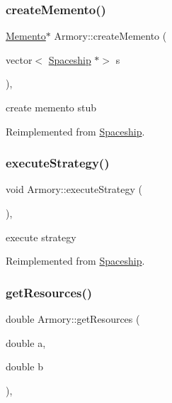 \subsubsection{\texorpdfstring{create\+Memento()}{createMemento()}}
{\footnotesize\ttfamily \hyperlink{classMemento}{Memento}$\ast$ Armory\+::create\+Memento (\begin{DoxyParamCaption}\item[{vector$<$ \hyperlink{classSpaceship}{Spaceship} $\ast$$>$}]{s }\end{DoxyParamCaption})\hspace{0.3cm}{\ttfamily [inline]}, {\ttfamily [virtual]}}

create memento stub 

Reimplemented from \hyperlink{classSpaceship_a6d272f846b019dec8226ddab65648a7b}{Spaceship}.

\mbox{\label{classArmory_aab75c86069fac4995a56c6318a33e504}} 
\subsubsection{\texorpdfstring{execute\+Strategy()}{executeStrategy()}}
{\footnotesize\ttfamily void Armory\+::execute\+Strategy (\begin{DoxyParamCaption}{ }\end{DoxyParamCaption})\hspace{0.3cm}{\ttfamily [inline]}, {\ttfamily [virtual]}}

execute strategy 

Reimplemented from \hyperlink{classSpaceship}{Spaceship}.

\mbox{\label{classArmory_a06bba21799ef0b2a9f835632411420a4}} 
\subsubsection{\texorpdfstring{get\+Resources()}{getResources()}}
{\footnotesize\ttfamily double Armory\+::get\+Resources (\begin{DoxyParamCaption}\item[{double}]{a,  }\item[{double}]{b }\end{DoxyParamCaption})\hspace{0.3cm}{\ttfamily [inline]}, {\ttfamily [virtual]}}

